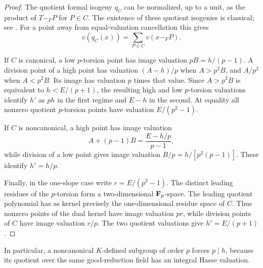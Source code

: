 \begin{proof}
The quotient formal isogeny $q_C$ can be normalized, up to a unit, as the
product of $T-_{F}P$ for $P\in C$. The existence of these quotient
isogenies is classical; see \citet{Lubin1967}. For a point away from
equal-valuation cancellation this gives
\[
 v(q_C(x))=\sum_{P\in C}v(x-_{F}P).
\]

If $C$ is canonical, a low $p$-torsion point has image valuation
$pB=h/(p-1)$. A division point of a high point has valuation
$(A-h)/p$ when $A>p^2B$, and $A/p^2$ when $A<p^2B$.
Its image has valuation $p$ times that value. Since
$A>p^2B$ is equivalent to $h<E/(p+1)$, the resulting high and low
$p$-torsion valuations identify $h'$ as $ph$ in the first regime and
$E-h$ in the second. At equality all nonzero quotient $p$-torsion points
have valuation $E/(p^2-1)$.

If $C$ is noncanonical, a high point has image valuation
\[
 A+(p-1)B=\frac{E-h/p}{p-1},
\]
while division of a low point gives image valuation
$B/p=h/[p^2(p-1)]$. These identify $h'=h/p$.

Finally, in the one-slope case write $r=E/(p^2-1)$.
The distinct leading residues of the $p$-torsion form a two-dimensional
$\mathbf F_p$-space. The leading quotient polynomial has as kernel precisely the
one-dimensional residue space of $C$. Thus nonzero points of the dual
kernel have image valuation $pr$, while division points of $C$ have image
valuation $r/p$. The two quotient valuations give $h'=E/(p+1)$.
\end{proof}

In particular, a noncanonical $K$-defined subgroup of order $p$ forces
$p\mid h$, because its quotient over the same good-reduction field has an
integral Hasse valuation.

